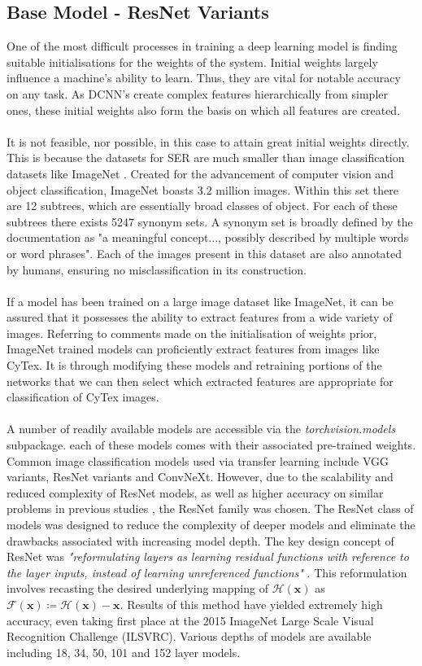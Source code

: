 \subsection{Base Model - ResNet Variants}
One of the most difficult processes in training a deep learning model is finding suitable initialisations for the weights of the system. Initial weights largely influence a machine's ability to learn. Thus, they are vital for notable accuracy on any task. As DCNN's create complex features hierarchically from simpler ones, these initial weights also form the basis on which all features are created.\\ \\
It is not feasible, nor possible, in this case  to attain great initial weights directly. This is because the datasets for SER are much smaller than image classification datasets like ImageNet \cite{deng2009imagenet}. Created for the advancement of computer vision and object classification, ImageNet boasts 3.2 million images. Within this set there are 12 subtrees, which are essentially broad classes of object. For each of these subtrees there exists 5247 synonym sets. A synonym set is broadly defined by the documentation as "a meaningful concept..., possibly described by multiple words or word phrases". Each of the images present in this dataset are also annotated by humans, ensuring no misclassification in its construction.\\ \\
If a model has been trained on a large image dataset like ImageNet, it can be assured that it possesses the ability to extract features from a wide variety of images. Referring to comments made on the initialisation of weights prior, ImageNet trained models can proficiently extract features from images like CyTex. It is through modifying these models and retraining portions of the networks that we can then select which extracted features are appropriate for classification of CyTex images. \\ \\
A number of readily available models are accessible via the \textit{torchvision.models} subpackage. each of these models comes with their associated pre-trained weights. Common image classification models used via transfer learning include VGG variants, ResNet variants and ConvNeXt. However, due to the scalability and reduced complexity of ResNet models, as well as higher accuracy on similar problems in previous studies \cite{CyTexRef}, the ResNet family was chosen. The ResNet class of models was designed to reduce the complexity of deeper models and eliminate the drawbacks associated with increasing model depth. The key design concept of ResNet was \textit{"reformulating layers as learning residual functions with reference to the layer inputs, instead of learning unreferenced functions"} \cite{he2015deep}. This reformulation involves recasting the desired underlying mapping of $\mathcal{H(\mathbf{x})}$ as $\mathcal{F(\mathbf{x})} \coloneqq \mathcal{H(\mathbf{x})} - \mathbf{x}$. Results of this method have yielded extremely high accuracy, even taking first place at the 2015 ImageNet Large Scale Visual Recognition Challenge (ILSVRC). Various depths of models are available including 18, 34, 50, 101 and 152 layer models.

